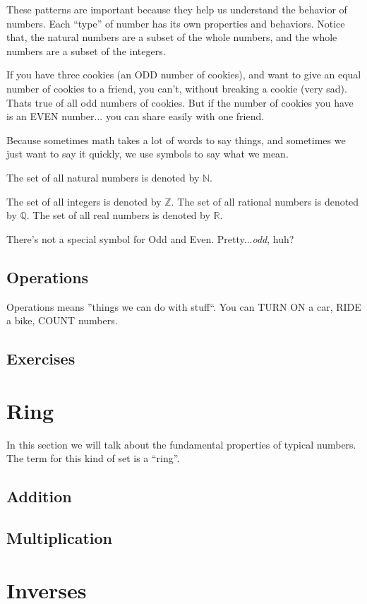 These patterns are important because they help us understand the behavior of numbers. Each ``type'' of number has its own properties and behaviors.
Notice that, the natural numbers are a subset of the whole numbers, and the whole numbers are a subset of the integers.

If you have three cookies (an ODD number of cookies), and want to give an equal number of cookies to a friend, you can't, without breaking a cookie (very sad). Thats true of all odd numbers of cookies. But if the number of cookies you have is an EVEN number... you can share easily with one friend. 

Because sometimes math takes a lot of words to say things, and sometimes we just want to say it quickly, we use symbols to say what we mean. 

The set of all natural numbers is denoted by $\mathbb{N}$.

The set of all integers is denoted by
$\mathbb{Z}$.
The set of all rational numbers is denoted by $\mathbb{Q}$.
The set of all real numbers is denoted by $\mathbb{R}$.

There's not a special symbol for Odd and Even. Pretty...\textit{odd}, huh?

\subsection{Operations}

Operations means ''things we can do with stuff``.  You can TURN ON a car, RIDE a bike, COUNT numbers. 

\subsection{Exercises}

\section{Ring}
In this section we will talk about the fundamental properties of typical numbers.
The term for this kind of set is a ``ring''.
\subsection{Addition}
\subsection{Multiplication}
\section{Inverses}
